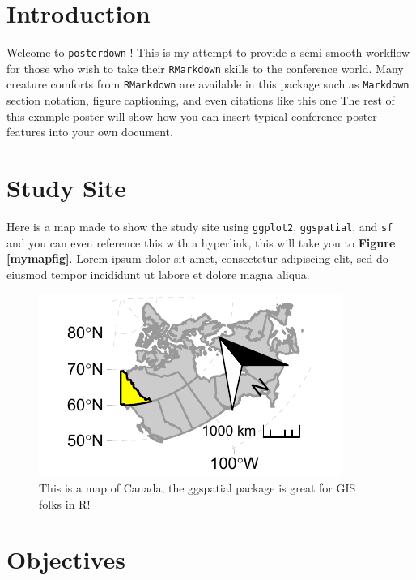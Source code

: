 \documentclass[article,6pt,extrafontsizes]{memoir}
\begin{document}
\begin{adjmulticols*}{3}{0.1cm}{0.1cm}
\normalsize{  %
\color{bodytextcol}
\section{Introduction}\label{introduction}

Welcome to \texttt{posterdown} ! This is my attempt to provide a
semi-smooth workflow for those who wish to take their \texttt{RMarkdown}
skills to the conference world. Many creature comforts from
\texttt{RMarkdown} are available in this package such as
\texttt{Markdown} section notation, figure captioning, and even
citations like this one \autocite{holden_identifying_2012} The rest of
this example poster will show how you can insert typical conference
poster features into your own document.

\section{Study Site}\label{study-site}

Here is a map made to show the study site using \texttt{ggplot2},
\texttt{ggspatial}, and \texttt{sf} and you can even reference this with
a hyperlink, this will take you to \textbf{Figure \ref{mymapfig}}. Lorem
ipsum dolor sit amet, \autocite{middleton_geological_nodate} consectetur
adipiscing elit, sed do eiusmod tempor incididunt ut labore et dolore
magna aliqua. \vspace{1cm}

\begin{figure}

{\centering \includegraphics[width=0.5\linewidth]{OtagoPosterPortrait_files/figure-latex/unnamed-chunk-2-1} 

}

\caption{This is a map of Canada, the ggspatial package is great for GIS folks in R! \label{mymapfig}}\label{fig:unnamed-chunk-2}
\end{figure}

\lipsum[4]

\section{Objectives}\label{objectives}

}
\end{adjmulticols*}
\end{document}
